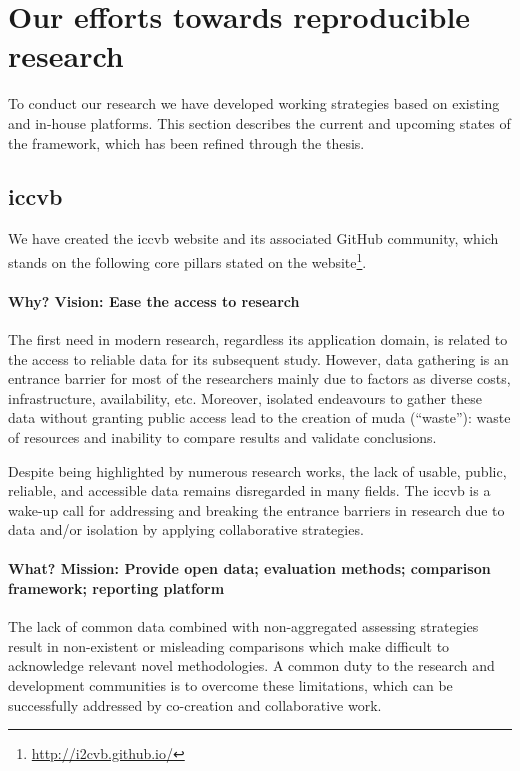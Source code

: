 \section{Our efforts towards reproducible research}
To conduct our research we have developed working strategies based on existing and in-house platforms.
This section describes the current and upcoming states of the framework, which has been refined through the thesis.

\subsection{\acs{iccvb}}
We have created the \acs{iccvb} website and its associated GitHub community, which stands on the following core pillars stated on the website\footnote{\url{http://i2cvb.github.io/}}.

\paragraph{Why? Vision: Ease the access to research}
The first need in modern research, regardless its application domain, is related to the access to reliable data for its subsequent study.
However, data gathering is an entrance barrier for most of the researchers mainly due to factors as diverse costs, infrastructure, availability, etc.
Moreover, isolated endeavours to gather these data without granting public access lead to the creation of muda (``waste''): waste of resources and inability to compare results and validate conclusions.

Despite being highlighted by numerous research works, the lack of usable, public, reliable, and accessible data remains disregarded in many fields.
The \ac{iccvb} is a wake-up call for addressing and breaking the entrance barriers in research due to data and/or isolation by applying collaborative strategies.

\paragraph{What? Mission: Provide open data; evaluation methods; comparison framework; reporting platform}
The lack of common data combined with non-aggregated assessing strategies result in non-existent or misleading comparisons which make difficult to acknowledge relevant novel methodologies.
A common duty to the research and development communities is to overcome these limitations, which can be successfully addressed by co-creation and collaborative work.

